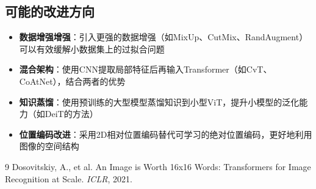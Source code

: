 \documentclass[12pt,a4paper]{article}
\begin{document}
\subsection{可能的改进方向}

\begin{itemize}
    \item \textbf{数据增强增强}：引入更强的数据增强（如MixUp、CutMix、RandAugment）可以有效缓解小数据集上的过拟合问题
    \item \textbf{混合架构}：使用CNN提取局部特征后再输入Transformer（如CvT、CoAtNet），结合两者的优势
    \item \textbf{知识蒸馏}：使用预训练的大型模型蒸馏知识到小型ViT，提升小模型的泛化能力（如DeiT的方法）
    \item \textbf{位置编码改进}：采用2D相对位置编码替代可学习的绝对位置编码，更好地利用图像的空间结构
\end{itemize}

\begin{thebibliography}{9}
 Dosovitskiy, A., et al. An Image is Worth 16x16 Words: Transformers for Image Recognition at Scale. \textit{ICLR}, 2021.
\end{thebibliography}
\end{document}
